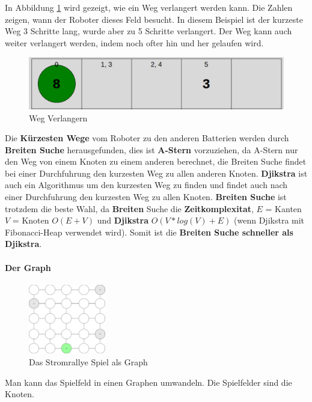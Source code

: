\documentclass[a4paper,12pt,arial]{scrartcl}
\begin{document}
In Abbildung \ref{fig:weg_verlangern} wird gezeigt, wie ein Weg verlangert werden kann. Die Zahlen zeigen, wann der Roboter dieses Feld besucht. In diesem Beispiel ist der kurzeste Weg 3 Schritte lang, wurde aber zu 5 Schritte verlangert. Der Weg kann auch weiter verlangert werden, indem noch ofter hin und her gelaufen wird.
\begin{figure}[h]
    \centering
    \includegraphics[height=0.09\textheight]{weg_verlaengern_n.pdf}
    \caption{Weg Verlangern}
    \label{fig:weg_verlangern}
\end{figure}
\par
Die \textbf{Kürzesten Wege} vom Roboter zu den anderen Batterien werden durch \textbf{Breiten Suche} \cite{cormen} herausgefunden, dies ist \textbf{A-Stern} \cite{hart} vorzuziehen, da A-Stern nur den Weg von einem Knoten zu einem anderen berechnet, die Breiten Suche findet bei einer Durchfuhrung den kurzesten Weg zu allen anderen Knoten. \textbf{Djikstra} \cite{dijkstra} ist auch ein Algorithmus um den kurzesten Weg zu finden und findet auch nach einer Durchfuhrung den kurzesten Weg zu allen Knoten. \textbf{Breiten Suche} ist trotzdem die beste Wahl, da \textbf{Breiten} Suche die \textbf{Zeitkomplexitat}, $E$ = Kanten $V$ = Knoten $O(E + V)$ und \textbf{Djikstra} $O(V * log(V) + E)$ (wenn Djikstra mit Fibonacci-Heap verwendet wird). Somit ist die \textbf{Breiten Suche schneller als Djikstra}.

\paragraph{Der Graph}
\captionsetup[figure]{name=Abb.}
\begin{figure}
    \includegraphics[width=0.3\textwidth]{graph_stromrallye.pdf}
    \caption{Das Stromrallye Spiel als Graph}
    \label{fig:graph_stromrallye}
    \vspace{-5pt}
\end{figure}
\captionsetup[figure]{name=Abbildung}
Man kann das Spielfeld in einen Graphen umwandeln. Die Spielfelder sind die Knoten.
\end{document}
